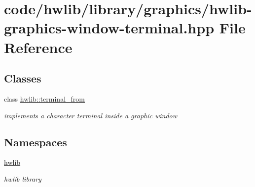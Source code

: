 \hypertarget{hwlib-graphics-window-terminal_8hpp}{}\section{code/hwlib/library/graphics/hwlib-\/graphics-\/window-\/terminal.hpp File Reference}
\label{hwlib-graphics-window-terminal_8hpp}
\subsection*{Classes}
\begin{DoxyCompactItemize}
\item 
class \hyperlink{classhwlib_1_1terminal__from}{hwlib\+::terminal\+\_\+from}
\begin{DoxyCompactList}\small\item\em implements a character terminal inside a graphic window \end{DoxyCompactList}\end{DoxyCompactItemize}
\subsection*{Namespaces}
\begin{DoxyCompactItemize}
\item 
 \hyperlink{namespacehwlib}{hwlib}
\begin{DoxyCompactList}\small\item\em hwlib library \end{DoxyCompactList}\end{DoxyCompactItemize}
